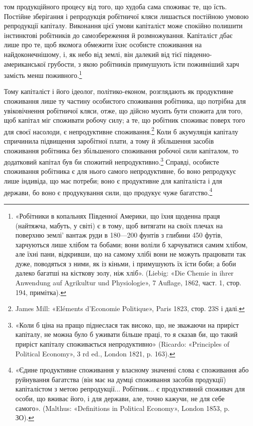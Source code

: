 \parcont{}  %
том продукційного процесу від того, що худоба сама споживає
те, що їсть. Постійне зберігання і репродукція робітничої кляси
лишається постійною умовою репродукції капіталу. Виконання
цієї умови капіталіст може спокійно полишити інстинктові
робітників до самозбереження й розмножування. Капіталіст
дбає лише про те, щоб якомога обмежити їхнє особисте споживання
на найдоконечнішому, і, як небо від землі, він далекий від
тієї південно-американської грубости, з якою робітників примушують
їсти поживніший харч замість менш поживного.\footnote{
«Робітники в копальнях Південної Америки, що їхня щоденна
праця (найтяжча, мабуть, у світі) є в тому, щоб витягати на своїх плечах
на поверхню землі' вантаж руди в 180—200 фунтів з глибини 450 футів,
харчуються лише хлібом та бобами; вони воліли б харчуватися
самим хлібом, але їхні пани, відкривши, що на самому хлібі вони не
можуть працювати так дуже, поводяться з ними, як із кіньми, і примушують
їх їсти боби; а боби далеко багатші на кісткову золу, ніж хліб».
(Liebig: «Die Chemie in ihrer Anwendung auf Agrikultur und Physiologie»,
7 Auflage, 1862, част. 1, стор. 194, примітка).
}

Тому капіталіст і його ідеолог, політико-економ, розглядають
як продуктивне споживання лише ту частину особистого споживання
робітника, що потрібна для увіковічнення робітничої
кляси, отже, що дійсно мусить бути спожита для того, щоб капітал
міг споживати робочу силу; а те, що робітник споживає поверх
того для своєї насолоди, є непродуктивне споживання.\footnote{
James Mill: «Eléments d’Economie Politique», Paris 1823, стор. 23S
і далі.
}
Коли б акумуляція капіталу спричинила підвищення заробітної
плати, а тому й збільшення засобів споживання робітника без
збільшеного споживання робочої сили капіталом, то додатковий
капітал був би спожитий непродуктивно.\footnote{
«Коли б ціна на пращо піднеслася так високо, що, не зважаючи
на приріст капіталу, не можна було б уживати більше праці, то я сказав
би, що такий приріст капіталу споживається непродуктивно» (Ricardo:
«Principles of Political Economy», 3 rd ed., London 1821, p. 163).
} Справді, особисте
споживання робітника є для нього самого непродуктивне, бо воно
репродукує лише індивіда, що має потреби; воно є продуктивне
для капіталіста і для держави, бо воно є продукування сили,
що продукує чуже багатство.\footnote{
«Єдине продуктивне споживання у власному значенні слова є
споживання або руйнування багатства (він має на думці споживання
засобів продукції) капіталістом з метою репродукції... Робітник... є
продуктивний споживач для особи, що вживає його, і для держави, але,
точно кажучи, не для себе самого». (Malthus: «Definitions in Political
Economy», London 1853, p. ЗО).
}

